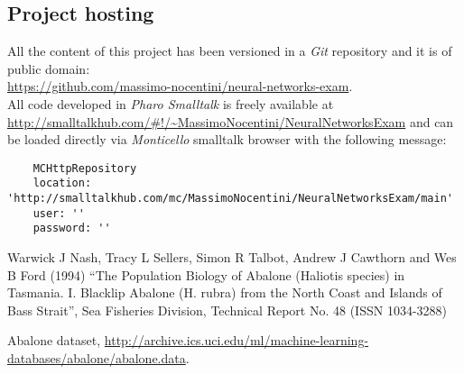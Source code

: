 \documentclass[10pt,a4paper]{article}
\begin{document}
    \subsection{Project hosting}
    All the content of this project has been versioned in a \emph{Git} repository and 
    it is of public domain:\\
    \url{https://github.com/massimo-nocentini/neural-networks-exam}.\\

    All code developed in \emph{Pharo Smalltalk} is freely available at
    \url{http://smalltalkhub.com/#!/~MassimoNocentini/NeuralNetworksExam}
    and can be loaded directly via \emph{Monticello} smalltalk browser
    with the following message:
    \begin{adjustwidth}{-2cm}{}
    \begin{verbatim}
    MCHttpRepository
    location: 'http://smalltalkhub.com/mc/MassimoNocentini/NeuralNetworksExam/main'
    user: ''
    password: ''
    \end{verbatim}
    \end{adjustwidth}    
      
    \begin{thebibliography}{9}

    Warwick J Nash, Tracy L Sellers, Simon R Talbot, Andrew J Cawthorn and
    Wes B Ford (1994) ``The Population Biology of Abalone (Haliotis
    species) in Tasmania. I. Blacklip Abalone (H. rubra) from the North
    Coast and Islands of Bass Strait'', Sea Fisheries Division, Technical
    Report No. 48 (ISSN 1034-3288)


      Abalone dataset,
      \url{http://archive.ics.uci.edu/ml/machine-learning-databases/abalone/abalone.data}.



    \end{thebibliography}
\end{document}
